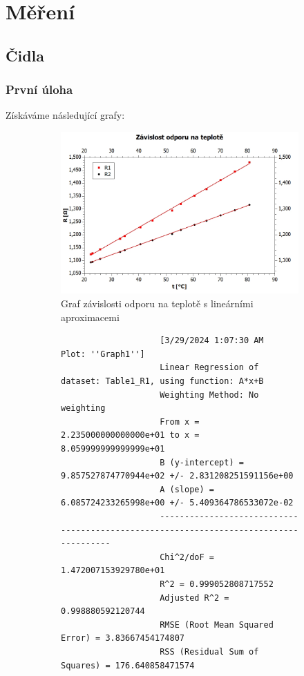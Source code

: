 \documentclass[czech,11pt,a4paper]{article}
\begin{document}
	\section{Měření}
	\subsection{Čidla}
	\subsubsection{První úloha}
	Získáváme následující grafy:
		\begin{figure}[H]
		
		\begin{subfigure}{0.6\textwidth}
			\includegraphics[width=1\linewidth, ]{odpor} 
			\caption{Graf závislosti odporu na teplotě s lineárními aproximacemi}
			\label{fig:subim1}
		\end{subfigure}
		\begin{subfigure}{0.4\textwidth}
			{\tiny \begin{verbatim}
					[3/29/2024 1:07:30 AM	Plot: ''Graph1'']
					Linear Regression of dataset: Table1_R1, using function: A*x+B
					Weighting Method: No weighting
					From x = 2.235000000000000e+01 to x = 8.059999999999999e+01
					B (y-intercept) = 9.857527874770944e+02 +/- 2.831208251591156e+00
					A (slope) = 6.085724233265998e+00 +/- 5.409364786533072e-02
					--------------------------------------------------------------------------------------
					Chi^2/doF = 1.472007153929780e+01
					R^2 = 0.999052808717552
					Adjusted R^2 = 0.998880592120744
					RMSE (Root Mean Squared Error) = 3.83667454174807
					RSS (Residual Sum of Squares) = 176.640858471574

\end{verbatim}}
\end{subfigure}
\end{figure}
\end{document}
